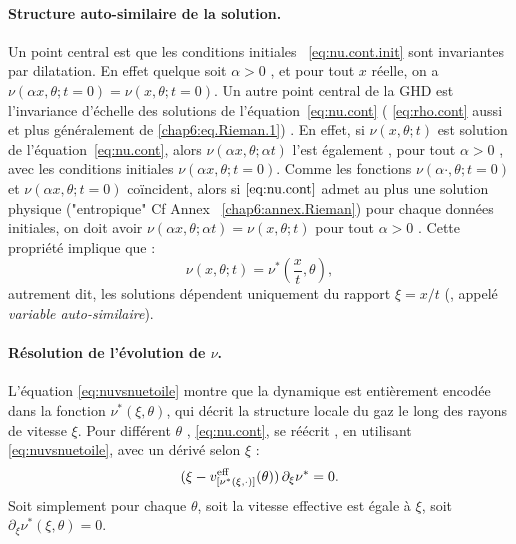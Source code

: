 \paragraph{Structure auto-similaire de la solution.}
Un point central est que les conditions initiales ~\eqref{eq:nu.cont.init} sont invariantes par dilatation. En effet quelque soit $\alpha >0$ , et pour tout $x$ réelle, on a $\nu(\alpha x , \theta ; t = 0 ) = \nu( x , \theta ; t = 0 ) $.
Un autre point central de la \gls*{GHD} est l’invariance d’échelle des solutions de l’équation~\eqref{eq:nu.cont} ( \eqref{eq:rho.cont} aussi et plus généralement de \eqref{chap6:eq.Rieman.1}) . En effet, si $\nu(x,\theta;t)$ est solution de  l’équation~\eqref{eq:nu.cont}, alors $\nu(\alpha x, \theta; \alpha t)$ l’est également ,  pour tout $\alpha > 0$ , avec les conditions initiales $\nu(\alpha x , \theta ; t = 0 )$. Comme les fonctions $\nu(\alpha \cdot , \theta ; t = 0 )$ et $\nu( \alpha x , \theta ; t = 0 )$ coïncident, alors si $\eqref{eq:nu.cont}$ admet au plus une solution physique ("entropique" Cf Annex ~\ref{chap6:annex.Rieman}) pour chaque données initiales, on doit avoir $\nu( \alpha x , \theta ; \alpha t ) = \nu(  x , \theta ;  t )$ pour tout $\alpha > 0 $ . Cette propriété implique que :
\begin{equation}
    \nu(x,\theta;t) = \nu^*\left(\frac{x}{t},\theta\right),
    \label{eq:nuvsnuetoile}
\end{equation}
autrement dit, les solutions dépendent uniquement du rapport $\xi = x/t$ (, appelé \emph{variable auto-similaire}). 


\paragraph{Résolution de l'évolution de $\nu$.} L'équation \eqref{eq:nuvsnuetoile} montre que la dynamique est  entièrement encodée dans la fonction $\nu^*(\xi,\theta)$, qui décrit la structure locale du gaz le long des rayons de vitesse $\xi$. Pour différent  $\theta$ , \eqref{eq:nu.cont},  se réécrit  , en utilisant \eqref{eq:nuvsnuetoile},   avec un dérivé selon $\xi$ : 
\begin{equation}
	( \xi - v^{\rm eff}_{[\nu^\ast(\xi,\cdot )  ]}(\theta) )\, \partial_\xi \nu^\ast  = 0 .	
\end{equation}
Soit simplement pour chaque $\theta$, soit la vitesse effective est égale à $\xi$, soit $\partial_\xi \nu^\ast(\xi,\theta) = 0$.

